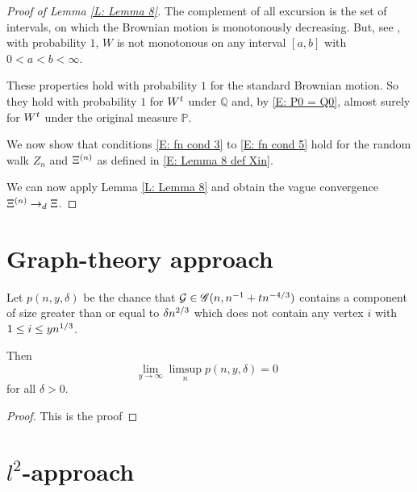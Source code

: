 \begin{proof}[Proof of Lemma \ref{L: Lemma 8}]
	The complement of all excursion is the set of intervals,
	on which the Brownian motion is monotonously decreasing.
	But, see \cite[Theorem 1.22]{Peres2008}, with probability $1$,
	$W$ is not monotonous on any interval $[a,b]$ with $0 < a < b < \infty$.
	
	These properties hold with probability $1$ for the standard Brownian motion.
	So they hold with probability $1$ for $W^t$ under $\mathbb{Q}$
	and, by \eqref{E: P0 = Q0}, 
	almost surely for $W^t$ under the original measure $\mathbb{P}$.
	
	
	We now show that conditions 
	\eqref{E: fn cond 3} to \eqref{E: fn cond 5}
	hold for the random walk $Z_n$ and $\Xi^{(n)}$
	as defined in \eqref{E: Lemma 8 def Xin}.
	


	We can now apply Lemma \ref{L: Lemma 8} and obtain the vague convergence
	$ \Xi^{(n)} \rightarrow_d \Xi $.
\end{proof}






\section{Graph-theory approach}



\begin{lemma} \label{L: Lemma 9}
	Let $p(n, y, \delta)$ be the chance that $\mathcal{G} \in \mathscr{G}(n, n^{-1} + tn^{-4/3})$
	contains a component of size greater than or equal to $\delta n^{2 / 3}$
	which does not contain any vertex $i$ with $1 \leq i \leq yn^{1 / 3}$.
	
	Then
	\begin{equation}
	\lim_{y \rightarrow \infty} \limsup_n p(n, y, \delta) = 0 \enspace
	\end{equation}
	for all $\delta > 0$.
\end{lemma}
\begin{proof}
	This is the proof
\end{proof}








\section{$l^2$-approach}
